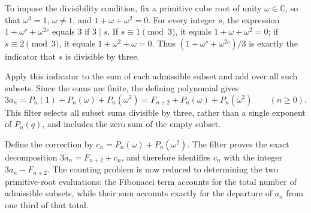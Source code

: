 \documentclass[11pt]{article}
\begin{document}
To impose the divisibility condition, fix a primitive cube root of unity $\omega\in\mathbb C$, so that $\omega^3=1$, $\omega\neq 1$, and $1+\omega+\omega^2=0$. For every integer $s$, the expression $1+\omega^s+\omega^{2s}$ equals $3$ if $3\mid s$. If $s\equiv 1\pmod 3$, it equals $1+\omega+\omega^2=0$; if $s\equiv 2\pmod 3$, it equals $1+\omega^2+\omega=0$. Thus $(1+\omega^s+\omega^{2s})/3$ is exactly the indicator that $s$ is divisible by three.

Apply this indicator to the sum of each admissible subset and add over all such subsets. Since the sums are finite, the defining polynomial gives
\[3a_n=P_n(1)+P_n(\omega)+P_n(\omega^2)=F_{n+2}+P_n(\omega)+P_n(\omega^2)\qquad(n\geq 0).\]
This filter selects all subset sums divisible by three, rather than a single exponent of $P_n(q)$, and includes the zero sum of the empty subset.

Define the correction by $c_n=P_n(\omega)+P_n(\omega^2)$. The filter proves the exact decomposition $3a_n=F_{n+2}+c_n$, and therefore identifies $c_n$ with the integer $3a_n-F_{n+2}$. The counting problem is now reduced to determining the two primitive-root evaluations: the Fibonacci term accounts for the total number of admissible subsets, while their sum accounts exactly for the departure of $a_n$ from one third of that total.
\end{document}
